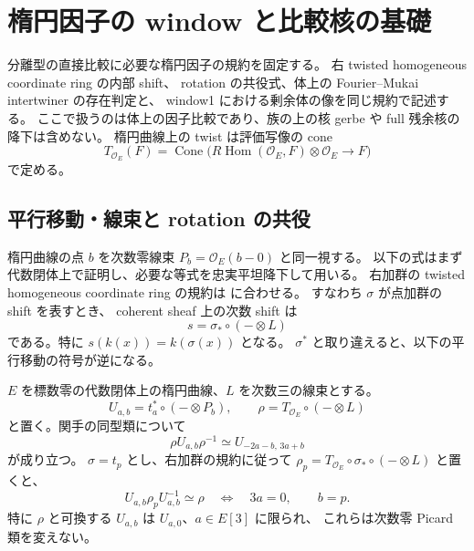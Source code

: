 \section{楕円因子の window と比較核の基礎}
\label{cf:sec:elliptic-foundations}

分離型の直接比較に必要な楕円因子の規約を固定する。
右 twisted homogeneous coordinate ring の内部 shift、
rotation の共役式、体上の Fourier--Mukai intertwiner の存在判定と、
window1 における剰余体の像を同じ規約で記述する。
ここで扱うのは体上の因子比較であり、族の上の核 gerbe や full 残余核の降下は含めない。
楕円曲線上の twist は評価写像の cone
\[
 T_{\mathcal O_E}(F)=\operatorname{Cone}\bigl(
 R\operatorname{Hom}(\mathcal O_E,F)\otimes\mathcal O_E\longrightarrow F\bigr)
\]
で定める。

\subsection{平行移動・線束と rotation の共役}

楕円曲線の点 $b$ を次数零線束 $P_b=\mathcal O_E(b-0)$ と同一視する。
以下の式はまず代数閉体上で証明し、必要な等式を忠実平坦降下して用いる。
右加群の twisted homogeneous coordinate ring の規約は
\cite[\S3, equation~(3.1)]{NFMStaffordVdB}に合わせる。
すなわち $\sigma$ が点加群の shift を表すとき、
coherent sheaf 上の次数 shift は
\begin{equation}
\label{eq:nfm-right-thcr-shift}
 s=\sigma_*\circ(-\otimes L)
\end{equation}
である。特に $s(k(x))=k(\sigma(x))$ となる。
$\sigma^*$ と取り違えると、以下の平行移動の符号が逆になる。

\begin{lemma}
\label{lem:nfm-elliptic-rotation-conjugacy}
$E$ を標数零の代数閉体上の楕円曲線、$L$ を次数三の線束とする。
\[
 U_{a,b}=t_a^*\circ(-\otimes P_b),\qquad
 \rho=T_{\mathcal O_E}\circ(-\otimes L)
\]
と置く。関手の同型類について
\begin{equation}
\label{eq:nfm-elliptic-rotation-conjugacy}
 \rho U_{a,b}\rho^{-1}\simeq U_{-2a-b,\,3a+b}
\end{equation}
が成り立つ。
$\sigma=t_p$ とし、右加群の規約に従って
$\rho_p=T_{\mathcal O_E}\circ\sigma_*\circ(-\otimes L)$ と置くと、
\begin{equation}
\label{eq:nfm-elliptic-point-intertwiner}
 U_{a,b}\rho_pU_{a,b}^{-1}\simeq\rho
 \quad\Longleftrightarrow\quad
 3a=0,\qquad b=p.
\end{equation}
特に $\rho$ と可換する $U_{a,b}$ は $U_{a,0}$、$a\in E[3]$ に限られ、
これらは次数零 Picard 類を変えない。
\end{lemma}

